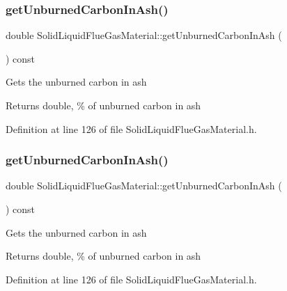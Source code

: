 \subsubsection{\texorpdfstring{get\+Unburned\+Carbon\+In\+Ash()}{getUnburnedCarbonInAsh()}\hspace{0.1cm}{\footnotesize\ttfamily [2/3]}}
{\footnotesize\ttfamily double Solid\+Liquid\+Flue\+Gas\+Material\+::get\+Unburned\+Carbon\+In\+Ash (\begin{DoxyParamCaption}{ }\end{DoxyParamCaption}) const\hspace{0.3cm}{\ttfamily [inline]}}

Gets the unburned carbon in ash \begin{DoxyReturn}{Returns}
double, \% of unburned carbon in ash 
\end{DoxyReturn}


Definition at line 126 of file Solid\+Liquid\+Flue\+Gas\+Material.\+h.

\mbox{\label{class_solid_liquid_flue_gas_material_a53ac34a949168a35297ab3afb9eb2c7b}} 
\subsubsection{\texorpdfstring{get\+Unburned\+Carbon\+In\+Ash()}{getUnburnedCarbonInAsh()}\hspace{0.1cm}{\footnotesize\ttfamily [3/3]}}
{\footnotesize\ttfamily double Solid\+Liquid\+Flue\+Gas\+Material\+::get\+Unburned\+Carbon\+In\+Ash (\begin{DoxyParamCaption}{ }\end{DoxyParamCaption}) const\hspace{0.3cm}{\ttfamily [inline]}}

Gets the unburned carbon in ash \begin{DoxyReturn}{Returns}
double, \% of unburned carbon in ash 
\end{DoxyReturn}


Definition at line 126 of file Solid\+Liquid\+Flue\+Gas\+Material.\+h.

\mbox{\label{class_solid_liquid_flue_gas_material_ad29543a88737c3d051c7d824287bc791}} 
